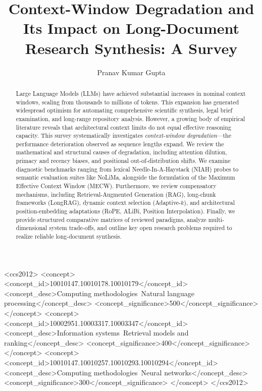 \documentclass[manuscript]{acmart}
\begin{document}
\title{Context-Window Degradation and Its Impact on Long-Document Research Synthesis: A Survey}

\author{Pranav Kumar Gupta}

\begin{abstract}
Large Language Models (LLMs) have achieved substantial increases in nominal context windows, scaling from thousands to millions of tokens. This expansion has generated widespread optimism for automating comprehensive scientific synthesis, legal brief examination, and long-range repository analysis. However, a growing body of empirical literature reveals that architectural context limits do not equal effective reasoning capacity. This survey systematically investigates \emph{context-window degradation}---the performance deterioration observed as sequence lengths expand. We review the mathematical and structural causes of degradation, including attention dilution, primacy and recency biases, and positional out-of-distribution shifts. We examine diagnostic benchmarks ranging from lexical Needle-In-A-Haystack (NIAH) probes to semantic evaluation suites like NoLiMa, alongside the formulation of the Maximum Effective Context Window (MECW). Furthermore, we review compensatory mechanisms, including Retrieval-Augmented Generation (RAG), long-chunk frameworks (LongRAG), dynamic context selection (Adaptive-$k$), and architectural position-embedding adaptations (RoPE, ALiBi, Position Interpolation). Finally, we provide structured comparative matrices of reviewed paradigms, analyze multi-dimensional system trade-offs, and outline key open research problems required to realize reliable long-document synthesis.
\end{abstract}

\begin{CCSXML}
<ccs2012>
   <concept>
       <concept_id>10010147.10010178.10010179</concept_id>
       <concept_desc>Computing methodologies~Natural language processing</concept_desc>
       <concept_significance>500</concept_significance>
       </concept>
   <concept>
       <concept_id>10002951.10003317.10003347</concept_id>
       <concept_desc>Information systems~Retrieval models and ranking</concept_desc>
       <concept_significance>400</concept_significance>
       </concept>
   <concept>
       <concept_id>10010147.10010257.10010293.10010294</concept_id>
       <concept_desc>Computing methodologies~Neural networks</concept_desc>
       <concept_significance>300</concept_significance>
       </concept>
 </ccs2012>
\end{CCSXML}
\end{document}
